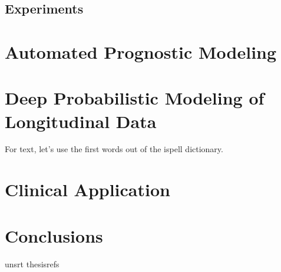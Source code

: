 \documentclass [PhD] {uclathes}
\begin{document}
\section{Experiments}
\label{ch3sec4}

\chapter{Automated Prognostic Modeling}

\chapter{Deep Probabilistic Modeling of Longitudinal Data}

For text, let's use the first words out of the ispell dictionary.

\chapter{Clinical Application}

\chapter{Conclusions}

 {unsrt} %
 {thesisrefs}    %
\end{document}
